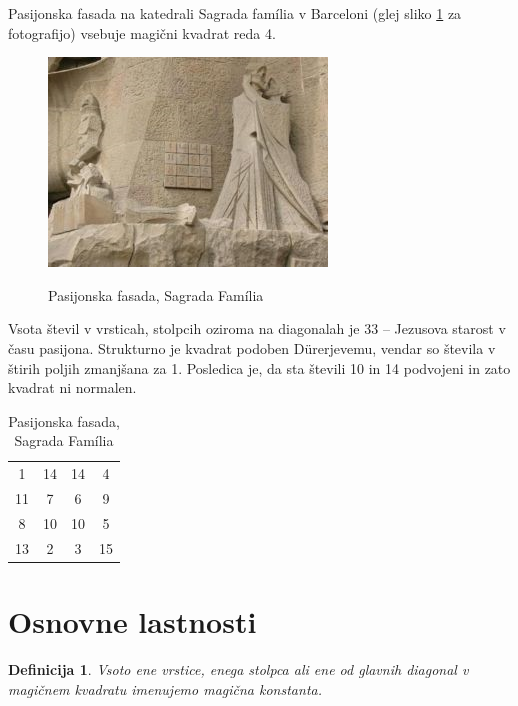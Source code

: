 \documentclass[a4paper,12pt]{article}
\newtheorem{definicija}[izrek]{Definicija}
\newcommand{\pojem}[1]{\emph{}{\color{purple}#1}}
\begin{document}
Pasijonska fasada na katedrali Sagrada família v Barceloni
(glej sliko \ref{fig:sagrada} za fotografijo) vsebuje magični kvadrat reda 4.

\begin{figure}
   \caption{Pasijonska fasada, Sagrada Família}
   \includegraphics{sagrada.png}
   \label{fig:sagrada}
\end{figure}

Vsota števil v vrsticah, stolpcih oziroma na diagonalah je 33 -- Jezusova starost
v času pasijona. Strukturno je kvadrat podoben Dürerjevemu, vendar so števila
v štirih poljih zmanjšana za 1. Posledica je, da sta števili 10 in 14 podvojeni
in zato kvadrat ni normalen.
%

\begin{table}
   \centering
   \caption{Pasijonska fasada, Sagrada Família}
   \label{table:sagrada}
   \begin{tabular}{cccc}\toprule
         1 & 14 & 14 &  4 \\
        11 &  7 &  6 &  9 \\
         8 & 10 & 10 &  5 \\
        13 &  2 &  3 & 15 \\ \bottomrule
   \end{tabular}
\end{table}


\section{Osnovne lastnosti}

\begin{definicija}
      Vsoto ene vrstice, enega stolpca ali ene od glavnih diagonal
      v magičnem kvadratu imenujemo \pojem{magična konstanta}.
\end{definicija}
\end{document}
